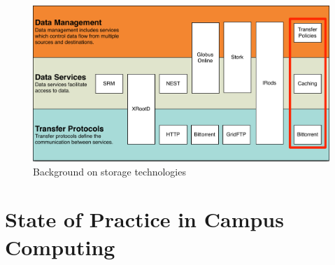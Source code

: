 \begin{figure}[ht!]
	\centering
	\includegraphics[width=\textwidth]{images/BackgroundStorageDiagram2.pdf}
	\caption{Background on storage technologies}
	\label{fig:backgroundstorage}
\end{figure}


\section{State of Practice in Campus Computing}



